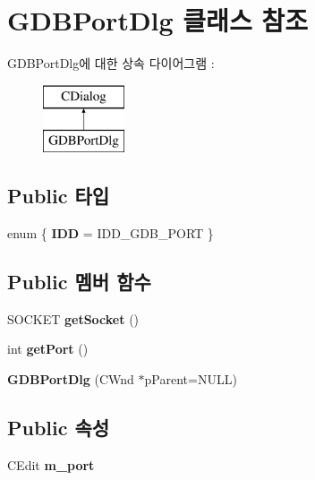 \hypertarget{class_g_d_b_port_dlg}{}\section{G\+D\+B\+Port\+Dlg 클래스 참조}
\label{class_g_d_b_port_dlg}
G\+D\+B\+Port\+Dlg에 대한 상속 다이어그램 \+: \begin{figure}[H]
\begin{center}
\leavevmode
\includegraphics[height=2.000000cm]{class_g_d_b_port_dlg}
\end{center}
\end{figure}
\subsection*{Public 타입}
\begin{DoxyCompactItemize}
\item 
\mbox{\label{class_g_d_b_port_dlg_a04b7310ce182cc037cf3e74852d61ebb}} 
enum \{ {\bfseries I\+DD} = I\+D\+D\+\_\+\+G\+D\+B\+\_\+\+P\+O\+RT
 \}
\end{DoxyCompactItemize}
\subsection*{Public 멤버 함수}
\begin{DoxyCompactItemize}
\item 
\mbox{\label{class_g_d_b_port_dlg_a6319081133e78827d9dfb6c287d88068}} 
S\+O\+C\+K\+ET {\bfseries get\+Socket} ()
\item 
\mbox{\label{class_g_d_b_port_dlg_aedb1de0b6ce4cf403b6be05f2a6d9668}} 
int {\bfseries get\+Port} ()
\item 
\mbox{\label{class_g_d_b_port_dlg_aaae63af104a2adb206c99bcb33e22794}} 
{\bfseries G\+D\+B\+Port\+Dlg} (C\+Wnd $\ast$p\+Parent=N\+U\+LL)
\end{DoxyCompactItemize}
\subsection*{Public 속성}
\begin{DoxyCompactItemize}
\item 
\mbox{\label{class_g_d_b_port_dlg_a243e7307371feed3fe058cbf822c3cb0}} 
C\+Edit {\bfseries m\+\_\+port}
\end{DoxyCompactItemize}
